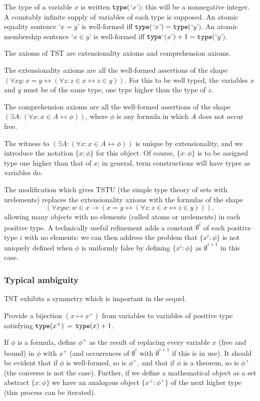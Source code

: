 \documentclass[112pt]{article}
\begin{document}
The type of a variable $x$ is written ${\tt type}($`$x$'$)$:  this will be a nonnegative integer.   A countably infinite supply of variables of each type is supposed.  An atomic equality sentence `$x=y$' is well-formed iff ${\tt type}($`$x$'$)={\tt type}($`$y$'$)$.
An atomic membership sentence `$x \in y$' is well-formed iff ${\tt type}$`$(x$'$)+1 = {\tt type}($`$y$'$)$.

The axioms of TST are extensionality axioms and comprehension axioms.

The extensionality axioms are all the well-formed assertions of the shape $(\forall xy:x=y \leftrightarrow (\forall z:z \in x \leftrightarrow z\in y))$.  For this to be well typed, the variables
$x$ and $y$ must be of the same type, one type higher than the type of $z$.

The comprehension axioms are all the well-formed assertions of the shape $(\exists A:(\forall x:x \in A \leftrightarrow \phi))$, where $\phi$ is any formula in which $A$ does not occur free.

The witness to $(\exists A:(\forall x:x \in A \leftrightarrow \phi))$ is unique by extensionality, and we introduce the notation $\{x:\phi\}$ for this object.  Of course, $\{x:\phi\}$  is to be assigned type one higher than that of $x$;  in general, term constructions will have types as variables do.

The modification which gives TSTU (the simple type theory of sets with urelements) replaces the extensionality axioms with the formulas of the shape $$(\forall xyw:w \in x \rightarrow (x=y \leftrightarrow (\forall z:z \in x \leftrightarrow z\in y))),$$  allowing many objects with no elements (called atoms or urelements)  in each positive type.  A technically useful refinement adds a constant $\emptyset^i$ of each positive type $i$ with no elements:  we can then address the problem that $\{x^i:\phi\}$ is not uniquely defined when $\phi$ is uniformly false by defining $\{x^i:\phi\}$ as $\emptyset^{i+1}$ in this case.

\subsubsection{Typical ambiguity}

TST exhibits a symmetry which is important in the sequel.

Provide a bijection $(x \mapsto x^+)$ from variables to variables of positive type satisfying   ${\tt type}(x^+)$ = ${\tt type}(x)+1$.

If $\phi$ is a formula, define $\phi^+$ as the result of replacing every variable $x$ (free and bound) in $\phi$ with $x^+$ (and occurrences of $\emptyset^i$ with $\emptyset^{i+1}$ if this is in use).   It should be evident that if $\phi$ is well-formed, so is $\phi^+$,
and that if $\phi$ is a theorem, so is $\phi^+$ (the converse is not the case).  Further, if we define a mathematical object as a set abstract $\{x:\phi\}$ we have an analogous
object $\{x^+:\phi^+\}$ of the next higher type (this process can be iterated).
\end{document}
